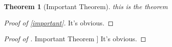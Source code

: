 \documentclass{article}
\newtheorem{theorem}{Theorem}[section] %
\begin{document}
\begin{theorem}[Important Theorem]\label{important} this is the theorem
\end{theorem}

\begin{proof}[Proof of \autoref{important}] It's obvious.
\end{proof}

\begin{proof}[Proof of \hyperref[important]{Important Theorem} ] It's obvious. \end{proof}
\end{document}
